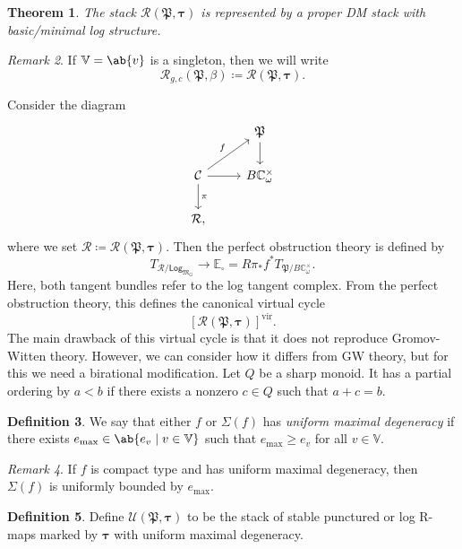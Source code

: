 \documentclass{amsart}
\newtheorem{thm}{Theorem}[section]
\theoremstyle{definition}
\newtheorem{defn}[thm]{Definition}
\theoremstyle{remark}
\newtheorem{rmk}[thm]{Remark}
\theoremstyle{plain}
\theoremstyle{definition}
\theoremstyle{remark}
\newcommand{\C}{\mathbb{C}}
\newcommand{\E}{\mathbb{E}}
\newcommand{\V}{\mathbb{V}}
\newcommand{\mc}[1]{\mathcal{#1}}
\newcommand{\mf}[1]{\mathfrak{#1}}
\newcommand{\mr}[1]{\mathrm{#1}}
\newcommand{\ms}[1]{\mathsf{#1}}
\newcommand{\1}{\mathbf{1}}
\newcommand{\2}{\mathbf{2}}
\newcommand{\3}{\mathbf{3}}
\newcommand{\vir}{\mr{vir}}
\begin{document}
\begin{thm}
    The stack \(\mc{R}(\mf{P},\bm{\tau})\) is represented by a proper DM stack with basic/minimal log structure.
\end{thm}

\begin{rmk}
    If \(\V = \ab\{v\}\) is a singleton, then we will write
    \[ \mc{R}_{g, c}(\mf{P}, \beta) \coloneqq \mc{R}(\mf{P}, \bm{\tau}). \]
\end{rmk}

Consider the diagram
\begin{equation*}
\begin{tikzcd}
    & \mf{P} \ar{d} \\
    \mc{C} \ar{ur}{f} \ar{d}{\pi} \ar{r} & B \C_{\omega}^{\times} \\
    \mc{R},
\end{tikzcd}
\end{equation*}
where we set \(\mc{R} \coloneqq \mc{R}(\mf{P}, \bm{\tau})\). Then the perfect obstruction theory is defined by
\[ T_{\mc{R}/\ms{Log}_{\mf{M}_G}} \to \E_{\square} = R \pi_* f^* T_{\mf{P}/B\C_{\omega}^{\times}}. \]
Here, both tangent bundles refer to the log tangent complex. From the perfect obstruction theory, this defines the canonical virtual cycle
\[ [\mc{R}(\mf{P}, \bm{\tau})]^{\vir}. \]
The main drawback of this virtual cycle is that it does not reproduce Gromov-Witten theory. However, we can consider how it differs from GW theory, but for this we need a birational modification. Let \(Q\) be a sharp monoid. It has a partial ordering by \(a < b\) if there exists a nonzero \(c \in Q\) such that \(a+c = b\).

\begin{defn}
    We say that either \(f\)  or \(\Sigma(f)\) has \textit{uniform maximal degeneracy} if there exists \(e_{\max} \in \ab\{e_v \mid v \in \V \}\) such that \(e_{\max} \geq e_v\) for all \(v \in \V\).
\end{defn}

\begin{rmk}
    If \(f\) is compact type and has uniform maximal degeneracy, then \(\Sigma(f)\) is uniformly bounded by \(e_{\max}\).
\end{rmk}

\begin{defn}
    Define \(\mc{U}(\mf{P}, \bm{\tau})\) to be the stack of stable punctured or log R-maps marked by \(\bm{\tau}\) with uniform maximal degeneracy.
\end{defn}
\end{document}
